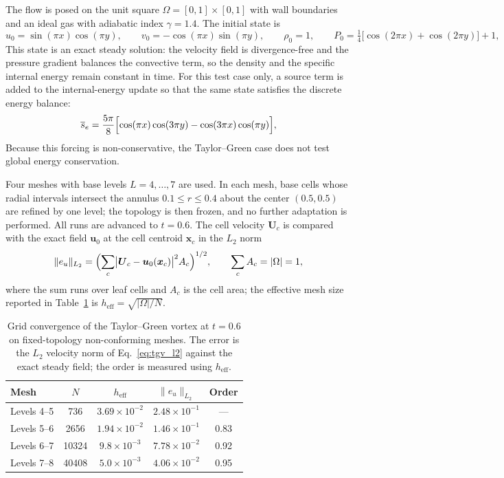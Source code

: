\documentclass[a4paper]{cas-sc}
\begin{document}
The flow is posed on the unit square $\Omega=[0,1]\times[0,1]$ with wall boundaries and an ideal gas with adiabatic index $\gamma=1.4$. The initial state is
\begin{equation}
	u_0=\sin(\pi x)\cos(\pi y),\qquad v_0=-\cos(\pi x)\sin(\pi y),\qquad \rho_0=1,\qquad P_0=\tfrac14\bigl[\cos(2\pi x)+\cos(2\pi y)\bigr]+1,
	\label{eq:tgv_ic}
\end{equation}
This state is an exact steady solution: the velocity field is divergence-free and the pressure gradient balances the convective term, so the density and the specific internal energy remain constant in time. For this test case only, a source term is added to the internal-energy update so that the same state satisfies the discrete energy balance:
\begin{equation}
	\overline{s}_e=\frac{5\pi}{8}\Bigl[\cos(\pi x)\cos(3\pi y)-\cos(3\pi x)\cos(\pi y)\Bigr],
	\label{eq:tgv_source}
\end{equation}
Because this forcing is non-conservative, the Taylor--Green case does not test global energy conservation.

Four meshes with base levels $L=4,\dots,7$ are used. In each mesh, base cells whose radial intervals intersect the annulus $0.1\le r\le0.4$ about the center $(0.5,0.5)$ are refined by one level; the topology is then frozen, and no further adaptation is performed. All runs are advanced to $t=0.6$. The cell velocity $\boldsymbol U_c$ is compared with the exact field $\boldsymbol u_0$ at the cell centroid $\boldsymbol x_c$ in the $L_2$ norm
\begin{equation}
	\|e_u\|_{L_2}=\Bigl(\sum_c\bigl|\boldsymbol U_c-\boldsymbol u_0(\boldsymbol x_c)\bigr|^{2}A_c\Bigr)^{1/2},
	\qquad \sum_c A_c=|\Omega|=1,
	\label{eq:tgv_l2}
\end{equation}
where the sum runs over leaf cells and $A_c$ is the cell area; the effective mesh size reported in Table~\ref{tab:tgv_convergence} is $h_{\mathrm{eff}}=\sqrt{|\Omega|/N}$.

\begin{table}[pos=htbp]
	\centering
	\caption{Grid convergence of the Taylor--Green vortex at $t=0.6$ on fixed-topology non-conforming meshes. The error is the $L_2$ velocity norm of Eq.~\eqref{eq:tgv_l2} against the exact steady field; the order is measured using $h_{\mathrm{eff}}$.}
	\label{tab:tgv_convergence}
	\begin{tabular}{lcccc}
		\hline
		Mesh & $N$ & $h_{\mathrm{eff}}$ & $\|e_u\|_{L_2}$ & Order \\
		\hline
		Levels 4--5 & 736   & $3.69\times10^{-2}$ & $2.48\times10^{-1}$ & ---  \\
		Levels 5--6 & 2656  & $1.94\times10^{-2}$ & $1.46\times10^{-1}$ & 0.83 \\
		Levels 6--7 & 10324 & $9.8\times10^{-3}$  & $7.78\times10^{-2}$ & 0.92 \\
		Levels 7--8 & 40408 & $5.0\times10^{-3}$  & $4.06\times10^{-2}$ & 0.95 \\
		\hline
	\end{tabular}
\end{table}
\end{document}
